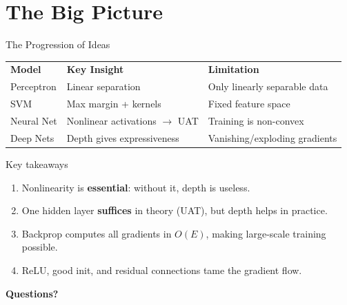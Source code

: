 \documentclass[aspectratio=169, professionalfonts]{beamer}
\begin{document}
\section{The Big Picture}

\begin{frame}{The Progression of Ideas}

\begin{center}
\small
\begin{tabular}{lll}
\textbf{Model} & \textbf{Key Insight} & \textbf{Limitation} \\[2pt]
Perceptron & Linear separation &
  Only linearly separable data \\[4pt]
SVM & Max margin + kernels &
  Fixed feature space \\[4pt]
Neural Net & Nonlinear activations $\to$ UAT &
  Training is non-convex \\[4pt]
Deep Nets & Depth gives expressiveness &
  Vanishing/exploding gradients
\end{tabular}
\end{center}

\bigskip

\begin{block}{Key takeaways}
\begin{enumerate}
  \item Nonlinearity is \textbf{essential}: without it, depth is useless.
  \item One hidden layer \textbf{suffices} in theory (UAT),
        but depth helps in practice.
  \item Backprop computes all gradients in $O(E)$,
        making large-scale training possible.
  \item ReLU, good init, and residual connections
        tame the gradient flow.
\end{enumerate}
\end{block}

\end{frame}

{
\begin{frame}[c]
\centering
\Huge\textbf{Questions?}
\end{frame}
}
\end{document}
